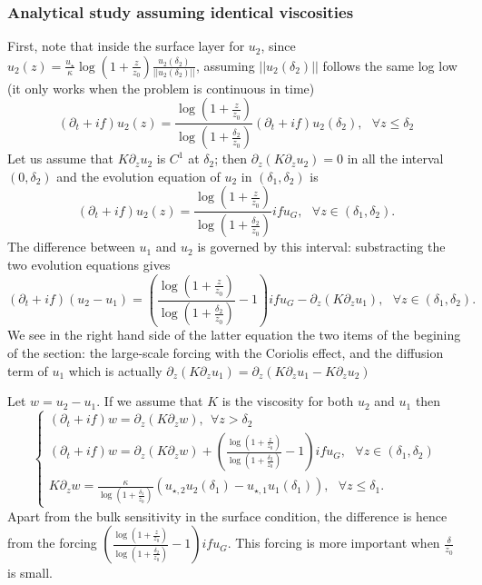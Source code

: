 \subsubsection{Analytical study assuming identical viscosities}
First, note that inside the surface layer for $u_2$,
since $u_2(z) = \frac{u_\star}{\kappa}\log(1+\frac{z}{z_0})
\frac{u_2(\delta_{2})}{||u_2(\delta_{2})||}$, assuming
$||u_2(\delta_{2})||$ follows the same log low (it only works
when the problem is continuous in time)
\begin{equation}
(\partial_t + if) u_2(z) = \frac{\log(1+\frac{z}{z_0})}
{\log(1+\frac{\delta_2}{z_0})}(\partial_t + if) u_2(\delta_2), 
~~~\forall z \leq \delta_2
\end{equation}
Let us assume that $K\partial_z u_2$ is $C^1$ at $\delta_2$;
then $\partial_z (K\partial_z u_2) = 0$ in all the interval
$(0, \delta_2)$ and the evolution equation of $u_2$ in
$(\delta_1, \delta_2)$ is
\begin{equation}
(\partial_t + if) u_2(z) = \frac{\log(1+\frac{z}{z_0})}
{\log(1+\frac{\delta_2}{z_0})} i f u_G, 
	~~~\forall z \in (\delta_1, \delta_2).
\end{equation}
The difference between $u_1$ and $u_2$ is governed by this interval:
substracting the two evolution equations gives
\begin{equation}
(\partial_t + if) (u_2 - u_1) = \left(\frac{\log(1+\frac{z}{z_0})}
{\log(1+\frac{\delta_2}{z_0})} - 1\right)i f u_G 
-
\partial_z (K \partial_z u_1), ~~~\forall z \in (\delta_1, \delta_2).
\end{equation}
We see in the right hand side of the latter equation the two items
of the begining of the section:
the large-scale forcing with the Coriolis effect,
and the diffusion term of $u_1$ which is actually
$\partial_z (K \partial_z u_1) = \partial_z (K \partial_z u_1 - K \partial_z u_2)$

Let $w=u_2 - u_1$. If we assume that $K$ is the viscosity for both
$u_2$ and $u_1$ then
\begin{equation}
	\begin{cases}
		(\partial_t + if) w = \partial_z (K \partial_z w) ,
		~~ \forall z > \delta_2 \\
(\partial_t + if) w = \partial_z (K \partial_z w) + \left(\frac{\log(1+\frac{z}{z_0})}
{\log(1+\frac{\delta_2}{z_0})} - 1\right)i f u_G 
, ~~~\forall z \in (\delta_1, \delta_2) \\
		K \partial_z w = \frac{\kappa}
		{\log(1+\frac{\delta_1}{z_0})}\left(
		u_{\star, 2} u_2(\delta_1) -
		u_{\star, 1} u_1(\delta_1)\right),
		~~~ \forall z \leq \delta_1.
	\end{cases}
\end{equation}
Apart from the bulk sensitivity in the surface condition,
the difference is hence from the forcing
$\left(\frac{\log(1+\frac{z}{z_0})}
{\log(1+\frac{\delta_2}{z_0})} - 1\right)i f u_G$.
This forcing is more important when $\frac{\delta}{z_0}$
is small.
